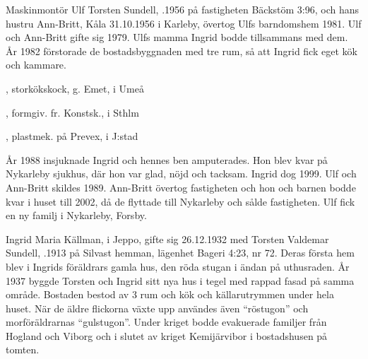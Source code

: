 Maskinmontör Ulf Torsten Sundell, .1956 på fastigheten Bäckstöm 3:96, och hans hustru Ann-Britt, \textborn Kåla 31.10.1956 i Karleby, övertog Ulfs barndomshem 1981. Ulf och Ann-Britt gifte sig 1979. Ulfs mamma Ingrid bodde tillsammans med dem. År 1982 förstorade de bostadsbyggnaden med tre rum, så att Ingrid fick eget kök och kammare.
\begin{jhchildren}
  \item {}, storkökskock, g. Emet, i Umeå
  \item {}, formgiv. fr. Konstsk., i Sthlm
  \item {}, plastmek. på Prevex, i J:stad
\end{jhchildren}

År 1988 insjuknade Ingrid och hennes ben amputerades. Hon blev kvar på Nykarleby sjukhus, där hon var glad, nöjd och tacksam. Ingrid dog 	1999. Ulf och Ann-Britt skildes 1989. Ann-Britt övertog fastigheten och	hon och barnen bodde kvar i huset till 2002, då de flyttade till Nykarleby och sålde fastigheten. Ulf fick en ny familj i Nykarleby, Forsby.




Ingrid Maria Källman,  i Jeppo, gifte sig 26.12.1932 med Torsten Valdemar Sundell, .1913 på Silvast hemman, 	lägenhet Bageri 4:23, nr 72. Deras första hem blev i Ingrids föräldrars gamla hus, den röda stugan i ändan på uthusraden. År 1937 byggde 	Torsten och Ingrid sitt nya hus i tegel med rappad fasad på samma område. Bostaden bestod av 3 rum och kök och källarutrymmen under hela huset. När de äldre flickorna växte upp användes även ``röstugon'' och morföräldrarnas ``gulstugon''. Under kriget bodde evakuerade 	familjer från Hogland och Viborg och i slutet av kriget Kemijärvibor i 	bostadshusen på tomten.
\begin{jhchildren}
  \item {}
  \item {}
  \item {}
  \item {}
  \item {}
  \item {}
  \item {}
\end{jhchildren}


